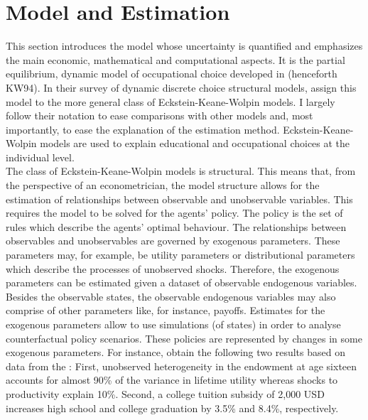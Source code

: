 \newpage %

\section{Model and Estimation}
\thispagestyle{plain} %
This section introduces the model whose uncertainty is quantified and emphasizes the main economic, mathematical and computational aspects. It is the partial equilibrium, dynamic model of occupational choice developed in \cite{Keane.1994} (henceforth KW94). In their survey of dynamic discrete choice structural models, \cite{Aguirregabiria.2010} assign this model to the more general class of Eckstein-Keane-Wolpin models. I largely follow their notation to ease comparisons with other models and, most importantly, to ease the explanation of the estimation method. Eckstein-Keane-Wolpin models are used to explain educational and occupational choices at the individual level. \\
\newline
The class of Eckstein-Keane-Wolpin models is structural. This means that, from the perspective of an econometrician, the model structure allows for the estimation of relationships between observable and unobservable variables. This requires the model to be solved for the agents' policy. The policy is the set of rules which describe the agents' optimal behaviour. The relationships between observables and unobservables are governed by exogenous parameters. These parameters may, for example, be utility parameters or distributional parameters which describe the processes of unobserved shocks. Therefore, the exogenous parameters can be estimated given a dataset of observable endogenous variables. Besides the observable states, the observable endogenous variables may also comprise of other parameters like, for instance, payoffs. Estimates for the exogenous parameters allow to use simulations (of states) in order to analyse counterfactual policy scenarios. These policies are represented by changes in some exogenous parameters. For instance, \cite{Keane.1997} obtain the following two results based on data from the : First, unobserved heterogeneity in the endowment at age sixteen accounts for almost 90\% of the variance in lifetime utility whereas shocks to productivity explain 10\%. Second, a college tuition subsidy of 2,000 USD increases high school and college graduation by 3.5\% and 8.4\%, respectively.\\
\newline
